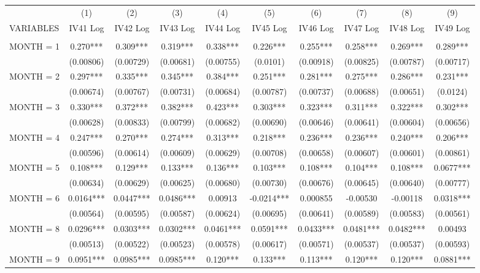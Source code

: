 \begin{tabular}{lccccccccc} \hline
 & (1) & (2) & (3) & (4) & (5) & (6) & (7) & (8) & (9) \\
VARIABLES & IV41 Log & IV42 Log & IV43 Log & IV44 Log & IV45 Log & IV46 Log & IV47 Log & IV48 Log & IV49 Log \\ \hline
 &  &  &  &  &  &  &  &  &  \\
MONTH = 1 & 0.270*** & 0.309*** & 0.319*** & 0.338*** & 0.226*** & 0.255*** & 0.258*** & 0.269*** & 0.289*** \\
 & (0.00806) & (0.00729) & (0.00681) & (0.00755) & (0.0101) & (0.00918) & (0.00825) & (0.00787) & (0.00717) \\
MONTH = 2 & 0.297*** & 0.335*** & 0.345*** & 0.384*** & 0.251*** & 0.281*** & 0.275*** & 0.286*** & 0.231*** \\
 & (0.00674) & (0.00767) & (0.00731) & (0.00684) & (0.00787) & (0.00737) & (0.00688) & (0.00651) & (0.0124) \\
MONTH = 3 & 0.330*** & 0.372*** & 0.382*** & 0.423*** & 0.303*** & 0.323*** & 0.311*** & 0.322*** & 0.302*** \\
 & (0.00628) & (0.00833) & (0.00799) & (0.00682) & (0.00690) & (0.00646) & (0.00641) & (0.00604) & (0.00656) \\
MONTH = 4 & 0.247*** & 0.270*** & 0.274*** & 0.313*** & 0.218*** & 0.236*** & 0.236*** & 0.240*** & 0.206*** \\
 & (0.00596) & (0.00614) & (0.00609) & (0.00629) & (0.00708) & (0.00658) & (0.00607) & (0.00601) & (0.00861) \\
MONTH = 5 & 0.108*** & 0.129*** & 0.133*** & 0.136*** & 0.103*** & 0.108*** & 0.104*** & 0.108*** & 0.0677*** \\
 & (0.00634) & (0.00629) & (0.00625) & (0.00680) & (0.00730) & (0.00676) & (0.00645) & (0.00640) & (0.00777) \\
MONTH = 6 & 0.0164*** & 0.0447*** & 0.0486*** & 0.00913 & -0.0214*** & 0.000855 & -0.00530 & -0.00118 & 0.0318*** \\
 & (0.00564) & (0.00595) & (0.00587) & (0.00624) & (0.00695) & (0.00641) & (0.00589) & (0.00583) & (0.00561) \\
MONTH = 8 & 0.0296*** & 0.0303*** & 0.0302*** & 0.0461*** & 0.0591*** & 0.0433*** & 0.0481*** & 0.0482*** & 0.00493 \\
 & (0.00513) & (0.00522) & (0.00523) & (0.00578) & (0.00617) & (0.00571) & (0.00537) & (0.00537) & (0.00593) \\
MONTH = 9 & 0.0951*** & 0.0985*** & 0.0985*** & 0.120*** & 0.133*** & 0.113*** & 0.120*** & 0.120*** & 0.0881*** \\

\end{tabular}
